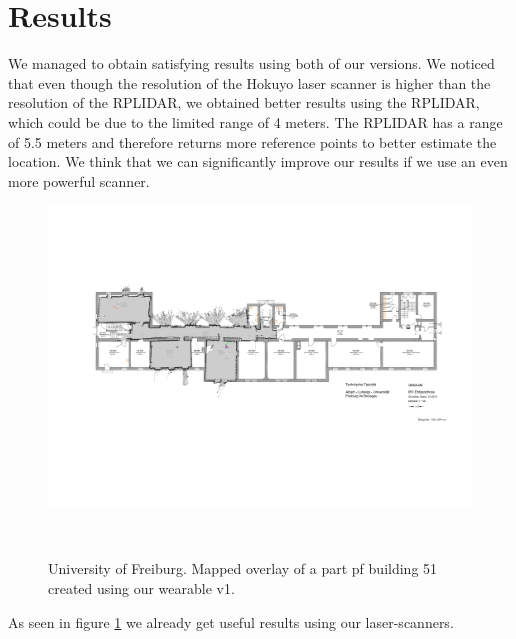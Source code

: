 \documentclass{sigchi-ext}
\begin{document}

\section{Results}
We managed to obtain satisfying results using both of our versions. We noticed that even though the resolution of the Hokuyo laser scanner is higher than the resolution of the RPLIDAR, we obtained better results using the RPLIDAR, which could be due to the limited range of 4 meters. The RPLIDAR has a range of 5.5 meters and therefore returns more reference points to better estimate the location. We think that we can significantly improve our results if we use an even more powerful scanner.
\begin{figure}
	\includegraphics[width=\textwidth]{51.png}
	\caption{University of Freiburg. Mapped overlay of a part pf building 51 created using our wearable v1.}~\label{fig:b51map}
\end{figure}
As seen in figure \ref{fig:b51map} we already get useful results using our laser-scanners. 
%
%

\balance{} 
\end{document}
